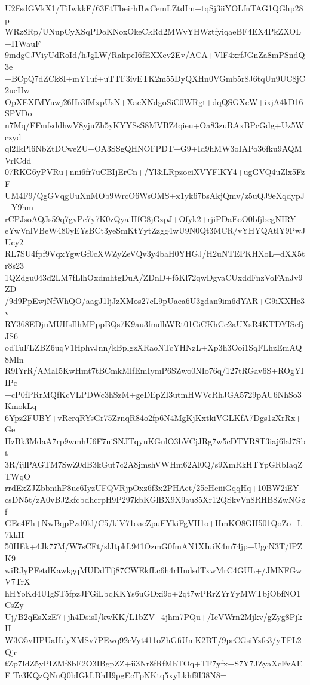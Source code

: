 U2FsdGVkX1/TiIwkkF/63EtTbeirhBwCemLZtdIm+tqSj3iiYOLfnTAG1QGhp28p
WRz8Rp/UNupCyXSqPDoKNoxOkeCkRd2MWvYHWztfyiqaeBF4EX4PkZXOL+I1WauF
9mdgCJViyUdRoId/hJgLW/RakpeI6fEXXev2Ev/ACA+VlF4xrfJGnZa8mPSndQ3e
+BCpQ7dZCk8I+mY1uf+uTTF3ivETK2m55DyQXHn0VGmb5r8J6tqUn9UC8jC2ueHw
OpXEXfMYuwj26Hr3fMxpUsN+XacXNdgoSiC0WRgt+dqQSGXcW+ixjA4kD16SPVDo
n7Mq/FFmfsddhwV8yjuZh5yKYYSsS8MVBZ4qieu+Oa83zuRAxBPcGdg+Uz5Wczyd
ql2IkPl6NbZtDCweZU+OA3SSgQHNOFPDT+G9+Id9hMW3oIAPo36fku9AQMVrlCdd
07RKG6yPVRu+nni6fr7uCBIjErCn+/Yl3iLRpzoeiXVYFlKY4+ugGVQ4uZlx5FzF
UM4F9/QgGVqgUuXnMOb9WrcO6WsOMS+x1yk67bsAkjQmv/z5uQJ9eXqdypJ+Y9hm
rCPJsoAQJs59q7gvPc7y7K0zQyaiHfG8jGzpJ+Ofyk2+rjiPDaEoO0bfjbegNIRY
eYwVnlVBeW480yEYsBCt3yeSmKtYytZzgg4wU9N0Qt3MCR/vYHYQAtlY9PwJUcy2
RL7SU4fpf9VqxYgwGf0cXWZyZeVQv3y4baH0YHGJ/H2uNTEPKHXoL+dXX5tr8s23
1QZdgu043d2LM7fLlhOxdmhtgDuA/ZDnD+f5Kl72qwDgvaCUxddFnzVoFAnJv9ZD
/9d9PpEwjNfWhQO/aagJ1ljJzXMos27cL9pUaea6U3gdan9im6dYAR+G9iXXHe3v
RY368EDjuMUHsIlhMPppBQs7K9au3fmdhWRt01CiCKhCc2aUXsR4KTDYISefjJS6
odTuFLZBZ6uqV1HphvJnn/kBplgzXRaoNTcYHNzL+Xp3h3Ooi1SqFLhzEmAQ8Mln
R9IYrR/AMaI5KwHmt7tBCmkMlfEmIymP6SZwo0NIo76q/127tRGav6S+ROgYIIPc
+cP0fPRrMQfKcVLPDWc3hSzM+geDEpZI3utmHWVcRhJGA5729pAU6NhSo3KmokLq
6Ypz2FUBY+vRcrqRYsGr75ZrnqR84o2fp6N4MgKjKxtkiVGLKfA7Dgs1zXrRx+Ge
HzBk3MdaA7rp9wmhU6F7uiSNJTqyuKGulO3bVCjJRg7w5cDTYR8T3iaj6lal7Sbt
3R/ijlPAGTM7SwZ0dB3kGut7c2A8jmshVWHm62Al0Q/s9XmRkHTYpGRbIaqZTWqO
rrdExZJZbbnihP8uc6IyzUFQVRjpOxz6f3x2PHAet/25eHciiiGqqHq+10BW2iEY
csDN5t/zA0vBJ2kfcbdhcrpH9P297kbKGlBX9X9au85Xr12QSkvVn8RHB8ZwNGzf
GEc4Fh+NwBqpPzd0kl/C5/klV71oacZpuFYkiFgVH1o+HmKO8GH501QoZo+L7kkH
50HEk+4Jk77M/W7sCFt/slJtpkL941OzmG0fmAN1XIuiK4m74jp+UgcN3T/lPZK9
wiRJyPFetdKawkgqMUDdTfj87CWEkfLc6h4rHndsdTxwMrC4GUL+/JMNFGwV7TrX
hHYoKd4UIgST5fpzJFGiLbqKKYs6uGDxi9o+2qt7wPRrZYrYyMWTbjObfNO1CsZy
Uj/B2qEsXzE7+jh4DsisI/kwKK/L1bZV+4jhm7PQu+/IcVWrn2Mjkv/gZyg8PjkH
W3O5vHPUaHdyXMSv7PEwq92eVyt411oZhGfiUmK2BT/9prCGsiYzfe3/yTFL2Qjc
tZp7IdZ5yPIZMf8bF2O3IBgpZZ+ii3Nr8fRfMhTOq+TF7yfx+S7Y7JZyaXcFvAEF
Tc3KQzQNnQ0bIGkLBhH9pgEcTpNKtq5xyLkhf9I38N8=
